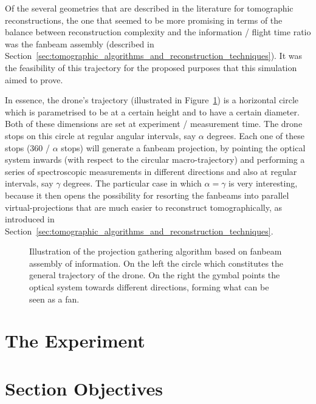 Of the several geometries that are described in the literature for
tomographic reconstructions, the one that seemed to be more promising in
terms of the balance between reconstruction complexity and the
information / flight time ratio was the fanbeam assembly (described in
Section~\ref{sec:tomographic_algorithms_and_reconstruction_techniques}).
It was the feasibility of this trajectory for the proposed purposes that
this simulation aimed to prove.

In essence, the drone's trajectory (illustrated in
Figure~\ref{fig:illustriated_trajectory_and_fanbeam_formation}) is a
horizontal circle which is parametrised to be at a certain height and to
have a certain diameter.  Both of these dimensions are set at experiment
/ measurement time. The drone stops on this circle at regular angular
intervals, say $\alpha$ degrees. Each one of these stops (360 / $\alpha$
stops) will generate a fanbeam projection, by pointing the optical
system inwards (with respect to the circular macro-trajectory) and
performing a series of spectroscopic measurements in different
directions and also at regular intervals, say $\gamma$ degrees. The
particular case in which $\alpha = \gamma$ is very interesting, because
it then opens the possibility for resorting the fanbeams into parallel
virtual-projections that are much easier to reconstruct tomographically,
as introduced in
Section~\ref{sec:tomographic_algorithms_and_reconstruction_techniques}.  

\begin{figure}[htpb]
    \centering
    \missingfigure{}
    \caption{Illustration of the projection gathering algorithm based on
    fanbeam assembly of information. On the left the circle which
    constitutes the general trajectory of the drone. On the right the
    gymbal points the optical system towards different directions, forming
    what can be seen as a fan.}
    \label{fig:illustriated_trajectory_and_fanbeam_formation}
\end{figure}



\section{The Experiment}%
\label{sec:the_experiment}








\section{Section Objectives}%
\label{sec:section_objectives}

